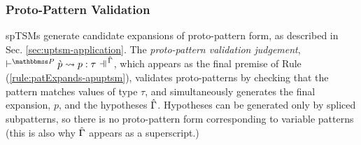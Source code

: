 {{{{%


\subsubsection{Proto-Pattern Validation}
spTSMs generate candidate expansions of proto-pattern form, as described in Sec. \ref{sec:uptsm-application}. The \emph{proto-pattern validation judgement}, $\cvalidP{\upctx}{\pscenev}{\cpv}{p}{\tau}$, which appears as the final premise of Rule (\ref{rule:patExpands-apuptsm}), validates proto-patterns by checking that the pattern matches values of type $\tau$, and simultaneously generates the final expansion, $p$, and the hypotheses $\hat\Gamma$. Hypotheses can be generated only by spliced subpatterns, so there is no proto-pattern form corresponding to variable patterns (this is also why $\hat\Gamma$ appears as a superscript.)

}}}}
